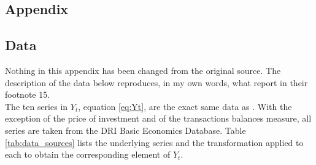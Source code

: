 \documentclass[12pt, a4paper]{article}
\begin{document}
\begin{appendices}
\section{Appendix}

\subsection{Data}
\label{app:data}
Nothing in this appendix has been changed from the original source. The description of the data below reproduces, in my own words, what \citet[fn.~15]{ACEL2005WP} report in their footnote 15.
\\

The ten series in $Y_t$, equation \eqref{eq:Yt}, are the exact same data as \citet{ACEL2005WP}. 
With the exception of the price of investment and of the transactions
balances measure, all series are taken from the DRI Basic Economics Database. Table
\ref{tab:data_sources} lists the underlying series and the transformation applied to each to
obtain the corresponding element of $Y_t$.


\end{appendices}
\end{document}
